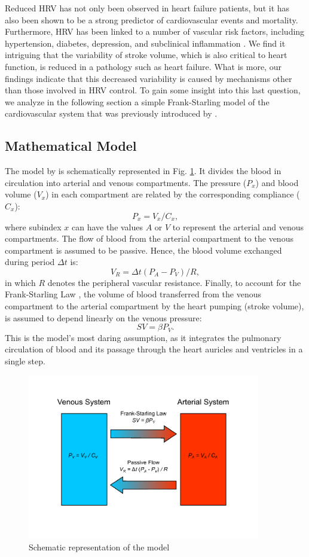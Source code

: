 \documentclass[%
preprint,
 amsmath,amssymb,
 aps,
]{revtex4-2}
\begin{document}
Reduced HRV has not only been observed in heart failure patients, but it has also been shown to be a strong predictor of cardiovascular events and mortality. Furthermore, HRV has been linked to a number of vascular risk factors, including hypertension, diabetes, depression, and subclinical inflammation \citep{Zeki_Al_Hazzouri_2014}. We find it intriguing that the variability of stroke volume, which is also critical to heart function, is reduced in a pathology such as heart failure. What is more, our findings indicate that this decreased variability is caused by mechanisms other than those involved in HRV control. To gain some insight into this last question, we analyze in the following section a simple Frank-Starling model of the cardiovascular system that was previously introduced by \citet{Upton_2005}.

\subsection{Mathematical Model}

The model by \citeauthor{Upton_2005} is schematically represented in Fig. \ref{fig:model}. It divides the blood in circulation into arterial and venous compartments. The pressure ($P_x$) and blood volume ($V_x$) in each compartment are related by the corresponding compliance ($C_x$):
\[
    P_x = V_x / C_x,
\] 
where subindex $x$ can have the values $A$ or $V$ to represent the arterial and venous compartments. The flow of blood from the arterial compartment to the venous compartment is assumed to be passive. Hence, the blood volume exchanged during period $\Delta t$ is:
\[
    V_R = \Delta t (P_A - P_V) / R,
\]
in which $R$ denotes the peripheral vascular resistance. Finally, to account for the Frank-Starling Law \citep{Jacob_1992}, the volume of blood transferred from the venous compartment to the arterial compartment by the heart pumping (stroke volume), is assumed to depend linearly on the venous pressure:
\[
    SV = \beta P_V.
\]
This is the model's most daring assumption, as it integrates the pulmonary circulation of blood and its passage through the heart auricles and ventricles in a single step.

\begin{figure}
\includegraphics[width=4in]{model.pdf}
\caption{Schematic representation of the model}
\label{fig:model}
\end{figure}
\end{document}
